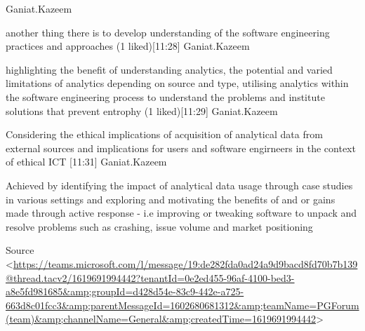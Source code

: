\begin{mdframed}[style=MyFrame]
[11:26] Ganiat.Kazeem
    
another thing there is to develop understanding of the software engineering practices and approaches
(1 liked)​[11:28] Ganiat.Kazeem
    
highlighting the benefit of understanding analytics,  the potential and varied limitations of analytics depending on source and type, utilising analytics within the software engineering process to understand the problems and institute solutions that prevent entrophy
(1 liked)​[11:29] Ganiat.Kazeem
    
Considering the ethical implications of acquisition of analytical data from external sources and implications for users and software engirneers in the context of ethical ICT
​[11:31] Ganiat.Kazeem
    
Achieved by identifying the impact of analytical data usage through case studies in various settings and exploring and motivating the benefits of and or gains made through active response - i.e improving or tweaking software to unpack and resolve problems such as crashing, issue volume and market positioning

Source <\url{https://teams.microsoft.com/l/message/19:de282fda0ad24a9d9bacd8fd70b7b139@thread.tacv2/1619691994442?tenantId=0e2ed455-96af-4100-bed3-a8e5fd981685&amp;groupId=d428d54e-83c9-442e-a725-663d8c01fcc3&amp;parentMessageId=1602680681312&amp;teamName=PGForum (team)&amp;channelName=General&amp;createdTime=1619691994442}>
\end{mdframed}